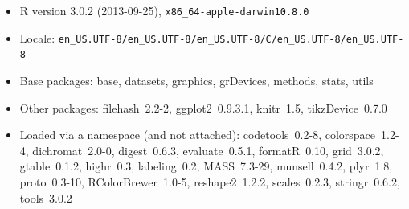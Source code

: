 \documentclass{article}\usepackage[]{graphicx}\usepackage[]{color}
\theoremstyle{rcode}
\begin{document}
\begin{itemize}\raggedright
  \item R version 3.0.2 (2013-09-25), \verb|x86_64-apple-darwin10.8.0|
  \item Locale: \verb|en_US.UTF-8/en_US.UTF-8/en_US.UTF-8/C/en_US.UTF-8/en_US.UTF-8|
  \item Base packages: base, datasets, graphics, grDevices,
    methods, stats, utils
  \item Other packages: filehash~2.2-2, ggplot2~0.9.3.1,
    knitr~1.5, tikzDevice~0.7.0
  \item Loaded via a namespace (and not attached):
    codetools~0.2-8, colorspace~1.2-4, dichromat~2.0-0,
    digest~0.6.3, evaluate~0.5.1, formatR~0.10, grid~3.0.2,
    gtable~0.1.2, highr~0.3, labeling~0.2, MASS~7.3-29,
    munsell~0.4.2, plyr~1.8, proto~0.3-10, RColorBrewer~1.0-5,
    reshape2~1.2.2, scales~0.2.3, stringr~0.6.2, tools~3.0.2
\end{itemize}
\end{document}
